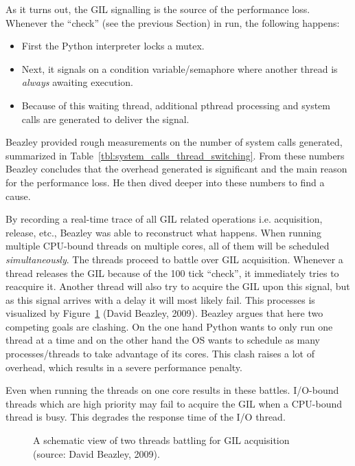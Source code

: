 As it turns out, the GIL signalling is the source of the performance loss.
Whenever the ``check'' (see the previous Section) in run, the following happens:

\begin{itemize}
	\item First the Python interpreter locks a mutex.
	\item Next, it signals on a condition variable/semaphore where another thread is \emph{always} awaiting execution.
	\item Because of this waiting thread, additional pthread processing and system calls are generated to deliver the signal.
\end{itemize}

Beazley provided rough measurements on the number of system calls generated, summarized in Table~\ref{tbl:system_calls_thread_switching}.
From these numbers Beazley concludes that the overhead generated is significant and the main reason for the performance loss.
He then dived deeper into these numbers to find a cause.

By recording a real-time trace of all GIL related operations i.e. acquisition, release, etc., Beazley was able to reconstruct what happens.
When running multiple CPU-bound threads on multiple cores, all of them will be scheduled \emph{simultaneously}.
The threads proceed to battle over GIL acquisition. 
Whenever a thread releases the GIL because of the 100 tick ``check'', it immediately tries to reacquire it.
Another thread will also try to acquire the GIL upon this signal, but as this signal arrives with a delay it will most likely fail.
This processes is visualized by Figure~\ref{fig:gil_battle_threads} (David Beazley, 2009).
Beazley argues that here two competing goals are clashing.
On the one hand Python wants to only run one thread at a time and on the other hand the OS wants to schedule as many processes/threads to take advantage of its cores.
This clash raises a lot of overhead, which results in a severe performance penalty.

Even when running the threads on one core results in these battles.
I/O-bound threads which are high priority may fail to acquire the GIL when a CPU-bound thread is busy.
This degrades the response time of the I/O thread.

 \begin{figure}[t!]
 	\caption{A schematic view of two threads battling for GIL acquisition (source: David Beazley, 2009).}
 	\label{fig:gil_battle_threads}
 \end{figure}

